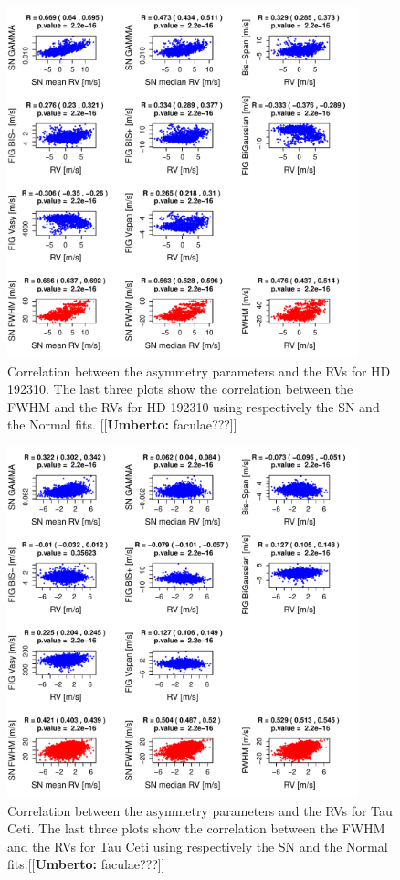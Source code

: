 \documentclass[11pt, oneside]{article}
\newcommand{\umberto}[1]{{\color{green}[[\textbf{Umberto: }#1]]}}
\begin{document}
\begin{figure}[htbp]
   \centering
\includegraphics[height = 4in]{HD19231_[4]Comparison_para.pdf} 
   \caption{Correlation between the asymmetry parameters and the RVs for HD 192310. The last three plots show the correlation between the FWHM and the RVs for HD 192310 using respectively the SN and the Normal fits. \umberto{faculae???}}
   \label{fig:Gliese785:corrPlot}
\end{figure}

\begin{figure}[htbp]
   \centering
\includegraphics[height = 4in]{HD10700_[4]Comparison_para.pdf}  
   \caption{Correlation between the asymmetry parameters and the RVs for Tau Ceti. The last three plots show the correlation between the FWHM and the RVs for Tau Ceti using respectively the SN and the Normal fits.\umberto{faculae???}}
   \label{fig:Tau:corrPlot}
\end{figure}
\end{document}
